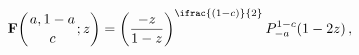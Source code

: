 \[\mathop{\mathbf{F}\/}\nolimits\!\left({a,1-a\atop c};z\right)=\left(\frac{-z}{%
1-z}\right)^{\ifrac{(1-c)}{2}}\*\mathop{P^{1-c}_{-a}\/}\nolimits\!\left(1-2z%
\right),\]